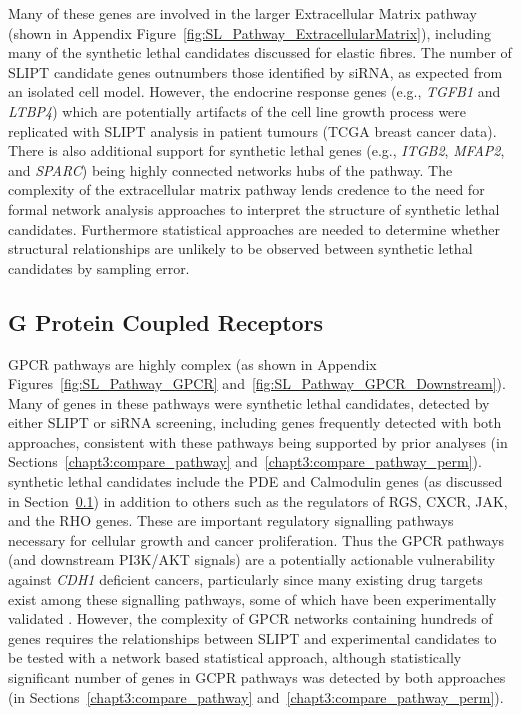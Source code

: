 Many of these genes are involved in the larger Extracellular Matrix pathway (shown in Appendix Figure~\ref{fig:SL_Pathway_ExtracellularMatrix}), including many of the \gls{synthetic lethal} candidates discussed for elastic fibres. The number of \gls{SLIPT} candidate genes outnumbers those identified by \gls{siRNA}, as expected from an isolated cell model. However, the endocrine response genes (e.g., \textit{TGFB1} and \textit{LTBP4}) which are potentially artifacts of the cell line growth process were replicated with \gls{SLIPT} analysis in patient tumours (TCGA breast cancer data). There is also additional support for \gls{synthetic lethal} genes (e.g., \textit{ITGB2}, \textit{MFAP2}, and \textit{SPARC}) being highly connected networks hubs of the pathway. The complexity of the extracellular matrix pathway lends credence to the need for formal network analysis approaches to interpret the  structure of \gls{synthetic lethal} candidates. Furthermore statistical approaches are needed to determine whether structural relationships are unlikely to be observed between \gls{synthetic lethal} candidates by sampling error. 

\FloatBarrier

\subsection{G Protein Coupled Receptors}  \label{chapt4:SL_Genes_GPCR}

\acrfull{GPCR} pathways are highly complex (as shown in Appendix Figures~\ref{fig:SL_Pathway_GPCR} and~\ref{fig:SL_Pathway_GPCR_Downstream}). Many of genes in these pathways were \gls{synthetic lethal} candidates, detected by either \gls{SLIPT} or \gls{siRNA} screening, including genes frequently detected with both approaches, consistent with these pathways being supported by prior analyses (in Sections~\ref{chapt3:compare_pathway} and~\ref{chapt3:compare_pathway_perm}). \Gls{synthetic lethal} candidates include the \gls{PDE} and Calmodulin genes (as discussed in Section~\ref{chapt4:SL_Genes_GPCR}) in addition to others such as the regulators of \gls{RGS}, \gls{CXCR}, \acrfull{JAK}, and the \gls{RHO} genes. These are important regulatory signalling pathways necessary for cellular growth and cancer proliferation. Thus the \gls{GPCR} pathways (and downstream PI3K/AKT signals) are a potentially actionable vulnerability against \textit{CDH1} deficient cancers, particularly since many existing drug targets exist among these signalling pathways, some of which have been experimentally validated \citep{Telford2015, KellyHDGC}. However, the complexity of \gls{GPCR} networks containing hundreds of genes requires the relationships between \gls{SLIPT} and experimental candidates to be tested with a network based statistical approach, although statistically significant number of genes in GCPR pathways was detected by both approaches (in Sections~\ref{chapt3:compare_pathway} and~\ref{chapt3:compare_pathway_perm}).



